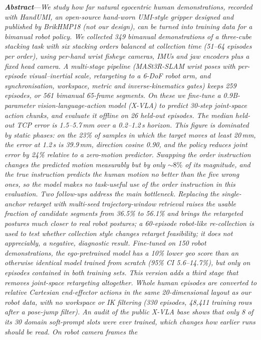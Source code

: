 \documentclass[conference,10pt]{IEEEtran}
\newcommand{\mm}{\,mm\xspace}
\newcounter{rpart}
\newcommand{\reportpart}[3]{\clearpage\stepcounter{rpart}\setcounter{section}{0}%
  \twocolumn[{\centering{\LARGE\bfseries #1\par}\vspace{1.5mm}{\large #2\par}\vspace{3mm}\hrule\vspace{5mm}}]\label{#3}}
\newcommand{\partabstract}[1]{\noindent\textbf{\textit{Abstract}}---\textit{#1}\par\medskip}
\begin{document}
\reportpart{Part I}{Three-Cube Stacking (bimanual)}{part:p1}
\partabstract{We study how far natural egocentric human demonstrations, recorded with HandUMI, an open-source hand-worn UMI-style gripper designed and published by BrikHMP18 (not our design), can be turned into
training data for a bimanual robot policy. We collected 349 bimanual demonstrations of a three-cube stacking task with six
stacking orders balanced at collection time (51--64 episodes per order), using per-hand wrist fisheye cameras, IMUs and jaw
encoders plus a fixed head camera. A multi-stage pipeline (MASt3R-SLAM wrist poses with per-episode visual--inertial scale,
retargeting to a 6-DoF robot arm, and synchronisation, workspace, metric and inverse-kinematics gates) keeps 259 episodes, or
561 bimanual 65-frame segments. On these we fine-tune a 0.9B-parameter vision-language-action model (X-VLA) to predict 30-step
joint-space action chunks, and evaluate it offline on 26 held-out episodes. The median held-out TCP error is 1.5--5.7\mm over a
0.2--1.2\,s horizon. This figure is dominated by static phases: on the 23\% of samples in which the target moves at least
20\mm, the error at 1.2\,s is 39.9\mm, direction cosine 0.90, and the policy reduces joint error by 24\% relative to a
zero-motion predictor. Swapping the order instruction changes the predicted motion measurably but by only ${\sim}8\%$ of its
magnitude, and the true instruction predicts the human motion no better than the five wrong ones, so the model makes no
task-useful use of the order instruction in this evaluation.
Two follow-ups address the main bottleneck. Replacing the single-anchor retarget with multi-seed trajectory-window
retrieval raises the usable fraction of candidate segments from 36.5\% to 56.1\% and brings the retargeted postures
much closer to real robot postures; a 60-episode robot-like re-collection is used to test whether collection style changes
retarget feasibility; it does not appreciably, a negative, diagnostic result. Fine-tuned on 150 robot demonstrations, the ego-pretrained model has a
10\% lower geo score than an otherwise identical model trained from scratch (95\% CI 5.6--14.7\%), but only on episodes
contained in both training sets.
This version adds a third stage that removes joint-space retargeting altogether. Whole human episodes are converted to
relative Cartesian end-effector actions in the same 20-dimensional layout as our robot data, with no workspace or IK
filtering (330 episodes, 48{,}411 training rows after a pose-jump filter). An audit of the public X-VLA base shows that only 8
of its 30 domain soft-prompt slots were ever trained, which changes how earlier runs should be read. On robot camera frames the
}
\end{document}

